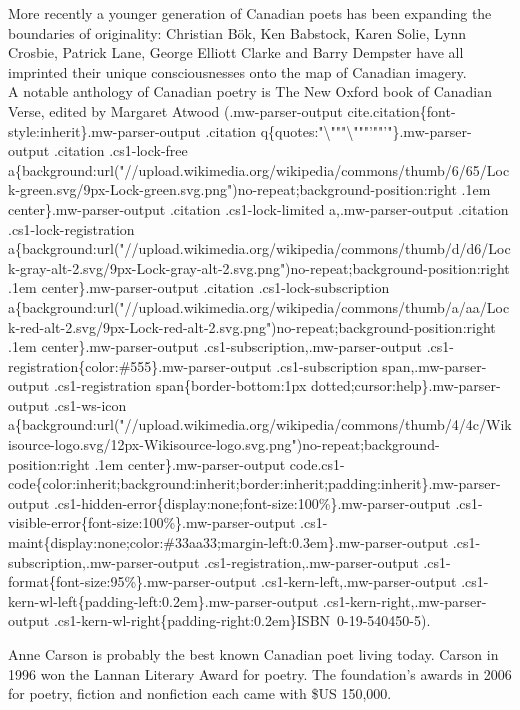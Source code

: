 More recently a younger generation of Canadian poets has been expanding
the boundaries of originality: Christian Bök, Ken Babstock, Karen Solie,
Lynn Crosbie, Patrick Lane, George Elliott Clarke and Barry Dempster
have all imprinted their unique consciousnesses onto the map of Canadian
imagery.\\
A notable anthology of Canadian poetry is The New Oxford book of
Canadian Verse, edited by Margaret Atwood (.mw-parser-output
cite.citation\{font-style:inherit\}.mw-parser-output .citation
q\{quotes:"\textbackslash{}"""\textbackslash{}"""'""'"\}.mw-parser-output
.citation .cs1-lock-free
a\{background:url("//upload.wikimedia.org/wikipedia/commons/thumb/6/65/Lock-green.svg/9px-Lock-green.svg.png")no-repeat;background-position:right
.1em center\}.mw-parser-output .citation .cs1-lock-limited
a,.mw-parser-output .citation .cs1-lock-registration
a\{background:url("//upload.wikimedia.org/wikipedia/commons/thumb/d/d6/Lock-gray-alt-2.svg/9px-Lock-gray-alt-2.svg.png")no-repeat;background-position:right
.1em center\}.mw-parser-output .citation .cs1-lock-subscription
a\{background:url("//upload.wikimedia.org/wikipedia/commons/thumb/a/aa/Lock-red-alt-2.svg/9px-Lock-red-alt-2.svg.png")no-repeat;background-position:right
.1em center\}.mw-parser-output .cs1-subscription,.mw-parser-output
.cs1-registration\{color:\#555\}.mw-parser-output .cs1-subscription
span,.mw-parser-output .cs1-registration span\{border-bottom:1px
dotted;cursor:help\}.mw-parser-output .cs1-ws-icon
a\{background:url("//upload.wikimedia.org/wikipedia/commons/thumb/4/4c/Wikisource-logo.svg/12px-Wikisource-logo.svg.png")no-repeat;background-position:right
.1em center\}.mw-parser-output
code.cs1-code\{color:inherit;background:inherit;border:inherit;padding:inherit\}.mw-parser-output
.cs1-hidden-error\{display:none;font-size:100\%\}.mw-parser-output
.cs1-visible-error\{font-size:100\%\}.mw-parser-output
.cs1-maint\{display:none;color:\#33aa33;margin-left:0.3em\}.mw-parser-output
.cs1-subscription,.mw-parser-output .cs1-registration,.mw-parser-output
.cs1-format\{font-size:95\%\}.mw-parser-output
.cs1-kern-left,.mw-parser-output
.cs1-kern-wl-left\{padding-left:0.2em\}.mw-parser-output
.cs1-kern-right,.mw-parser-output
.cs1-kern-wl-right\{padding-right:0.2em\}ISBN~0-19-540450-5).

Anne Carson is probably the best known Canadian poet living today.
Carson in 1996 won the Lannan Literary Award for poetry. The
foundation's awards in 2006 for poetry, fiction and nonfiction each came
with \$US 150,000.

